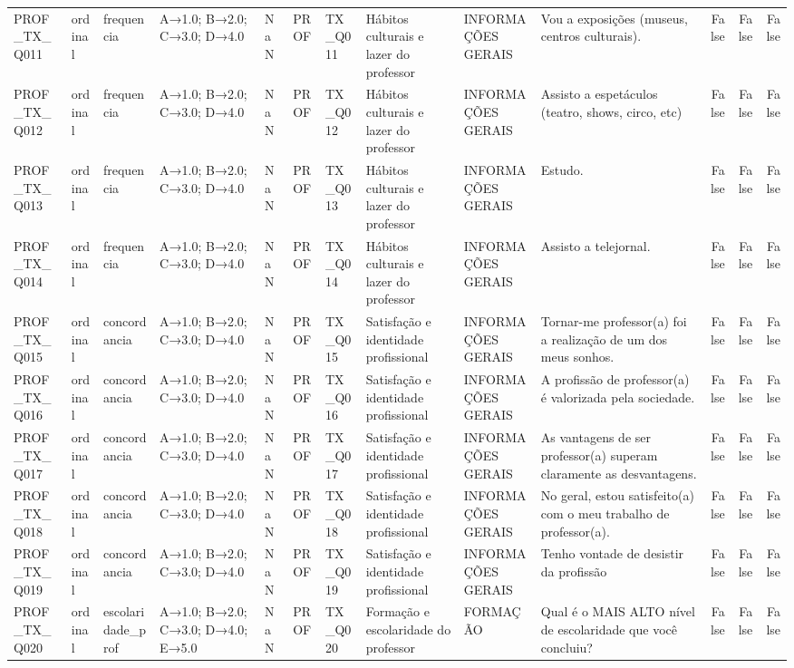 \begin{tabular}{llllllllllrrr}
PROF\_TX\_Q011 & ordinal & frequencia & A→1.0; B→2.0; C→3.0; D→4.0 & NaN & PROF & TX\_Q011 & Hábitos culturais e lazer do professor & INFORMAÇÕES GERAIS & Vou a exposições (museus, centros culturais). & False & False & False \\
PROF\_TX\_Q012 & ordinal & frequencia & A→1.0; B→2.0; C→3.0; D→4.0 & NaN & PROF & TX\_Q012 & Hábitos culturais e lazer do professor & INFORMAÇÕES GERAIS & Assisto a espetáculos (teatro, shows, circo, etc) & False & False & False \\
PROF\_TX\_Q013 & ordinal & frequencia & A→1.0; B→2.0; C→3.0; D→4.0 & NaN & PROF & TX\_Q013 & Hábitos culturais e lazer do professor & INFORMAÇÕES GERAIS & Estudo. & False & False & False \\
PROF\_TX\_Q014 & ordinal & frequencia & A→1.0; B→2.0; C→3.0; D→4.0 & NaN & PROF & TX\_Q014 & Hábitos culturais e lazer do professor & INFORMAÇÕES GERAIS & Assisto a telejornal. & False & False & False \\
PROF\_TX\_Q015 & ordinal & concordancia & A→1.0; B→2.0; C→3.0; D→4.0 & NaN & PROF & TX\_Q015 & Satisfação e identidade profissional & INFORMAÇÕES GERAIS & Tornar-me professor(a) foi a realização de um dos meus sonhos. & False & False & False \\
PROF\_TX\_Q016 & ordinal & concordancia & A→1.0; B→2.0; C→3.0; D→4.0 & NaN & PROF & TX\_Q016 & Satisfação e identidade profissional & INFORMAÇÕES GERAIS & A profissão de professor(a) é valorizada pela sociedade. & False & False & False \\
PROF\_TX\_Q017 & ordinal & concordancia & A→1.0; B→2.0; C→3.0; D→4.0 & NaN & PROF & TX\_Q017 & Satisfação e identidade profissional & INFORMAÇÕES GERAIS & As vantagens de ser professor(a) superam claramente as desvantagens. & False & False & False \\
PROF\_TX\_Q018 & ordinal & concordancia & A→1.0; B→2.0; C→3.0; D→4.0 & NaN & PROF & TX\_Q018 & Satisfação e identidade profissional & INFORMAÇÕES GERAIS & No geral, estou satisfeito(a) com o meu trabalho de professor(a). & False & False & False \\
PROF\_TX\_Q019 & ordinal & concordancia & A→1.0; B→2.0; C→3.0; D→4.0 & NaN & PROF & TX\_Q019 & Satisfação e identidade profissional & INFORMAÇÕES GERAIS & Tenho vontade de desistir da profissão & False & False & False \\
PROF\_TX\_Q020 & ordinal & escolaridade\_prof & A→1.0; B→2.0; C→3.0; D→4.0; E→5.0 & NaN & PROF & TX\_Q020 & Formação e escolaridade do professor & FORMAÇÃO & Qual é o MAIS ALTO nível de escolaridade que você concluiu? & False & False & False \\

\end{tabular}
